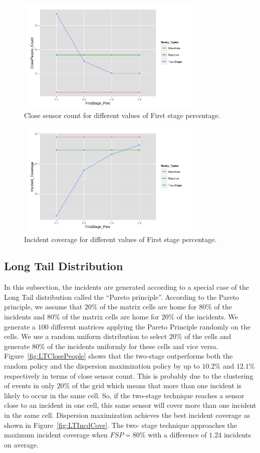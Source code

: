\documentclass{acm_proc_article-sp}
\begin{document}
\begin{figure}[!h]
\centering
  \includegraphics[width=9cm ,height=5.5cm]{figuresPng/Uni_ClosePeople_Count.png}
  \caption{Close sensor count for different values of First stage percentage. }
  \label{fig:uniClosePeople}
\end{figure}
\begin{figure}[!h]
\centering
  \includegraphics[width=9cm ,height=5.5cm]{figuresPng/Uni-Inc_Coverage.png}
  \caption{Incident coverage for different values of First stage percentage. }
  \label{fig:uniIncdCove}
\end{figure}

\subsection{Long Tail Distribution}
In this subsection, the incidents are generated according to a special case of the Long Tail distribution called the ``Pareto principle''. According to the Pareto principle, we assume that $20\%$ of the matrix cells are home for $80\%$ of the incidents and $80\%$ of the matrix cells are home for $20\%$ of the incidents. We generate a $100$ different matrices applying the Pareto Principle randomly on the cells. We use a random uniform distribution to select $20\%$ of the cells and generate $80\%$ of the incidents uniformly for these cells and vice versa. Figure~\ref{fig:LTClosePeople} shows that the two-stage outperforms both the random policy and the dispersion maximization policy by up to $10.2\%$ and $12.1\%$ respectively in terms of close sensor count. This is probably due to the clustering of events in only $20\%$ of the grid which means that more than one incident is likely to occur in the same cell. So, if the two-stage technique reaches a sensor close to an incident in one cell, this same sensor will cover more than one incident in the same cell. Dispersion maximization achieves the best incident coverage as shown in Figure~\ref{fig:LTIncdCove}. The two- stage technique approaches the maximum incident coverage when $FSP = 80\%$ with a difference of $1.24$ incidents on average.
\end{document}
